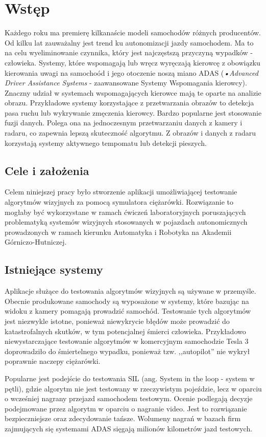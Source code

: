 \chapter{Wstęp}


Każdego roku ma premierę kilkanaście modeli samochodów różnych producentów. Od kilku lat zauważalny jest trend ku autonomizacji jazdy samochodem. Ma to na celu wyeliminowanie czynnika, który jest najczęstszą przyczyną wypadków - człowieka. Systemy, które wspomagają lub wręcz wyręczają kierowcę z obowiązku kierowania uwagi na samochoód i jego otoczenie noszą miano ADAS (\textit{•Advanced Driver Assistance Systems} - zaawansowane Systemy Wspomagania kierowcy). Znaczny udział w systemach wspomagających kierowce mają te oparte na analizie obrazu. Przykładowe systemy korzystające z przetwarzania obrazów to detekcja pasa ruchu lub wykrywanie zmęczenia kierowcy. Bardzo popularne jest stosowanie fuzji danych. Polega ona na jednoczesnym przetwarzaniu danych z kamery i radaru, co zapewnia lepszą skuteczność algorytmu. Z obrazów i danych z radaru korzystają systemy aktywnego tempomatu lub detekcji pieszych.


\section{Cele i założenia}

Celem niniejszej pracy było stworzenie aplikacji umożliwiającej testowanie algorytmów wizyjnych za pomocą symulatora ciężarówki.
Rozwiązanie to mogłaby być wykorzystane w ramach ćwiczeń laboratoryjnych poruszających problematyką systemów wizyjnych stosowanych w pojazdach autonomicznych prowadzonych w ramach kierunku Automatyka i Robotyka na Akademii Górniczo-Hutniczej.

\section{Istniejące systemy}
Aplikacje służące do testowania algorytmów wizyjnych są używane w przemyśle. 
Obecnie produkowane samochody są wyposażone w systemy, które bazując na widoku z kamery pomagają prowadzić samochód. 
Testowanie tych algorytmów jest niezwykle istotne, ponieważ niewykrycie błędów może prowadzić do katastrofalnych skutków, w tym potencjalnej śmierci człowieka. 
Przykładowo niewystarczające testowanie algorytmów w komercyjnym samochodzie Tesla 3 doprowadziło do śmiertelnego wypadku, ponieważ tzw. ,,autopilot'' nie wykrył poprawnie naczepy ciężarówki.

Popularne jest podejście do testowania SIL (ang. System in the loop - system w pętli), gdzie algorytm nie jest testowany w rzeczywistym pojeździe, lecz w oparciu o wcześniej nagrany przejazd samochodem testowym. Ocenie podlegają decyzje podejmowane przez algorytm w oparciu o nagranie video. Jest to rozwiązanie bezpieczniejsze oraz zdecydowanie tańsze. Wolumeny nagrań w bazach firm zajmujących się systemami ADAS sięgają milionów kilometrów jazd testowych.

